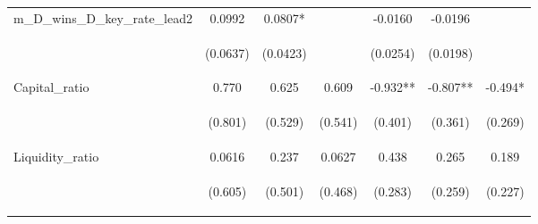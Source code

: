 \documentclass[]{article}
\begin{document}
\begin{center}
\begin{tabular}{lcccccc}
m\_D\_wins\_D\_key\_rate\_lead2 & 0.0992 & 0.0807* &  & -0.0160 & -0.0196 &  \\
\vspace{4pt} & \begin{footnotesize}(0.0637)\end{footnotesize} & \begin{footnotesize}(0.0423)\end{footnotesize} & \begin{footnotesize}\end{footnotesize} & \begin{footnotesize}(0.0254)\end{footnotesize} & \begin{footnotesize}(0.0198)\end{footnotesize} & \begin{footnotesize}\end{footnotesize} \\
Capital\_ratio & 0.770 & 0.625 & 0.609 & -0.932** & -0.807** & -0.494* \\
\vspace{4pt} & \begin{footnotesize}(0.801)\end{footnotesize} & \begin{footnotesize}(0.529)\end{footnotesize} & \begin{footnotesize}(0.541)\end{footnotesize} & \begin{footnotesize}(0.401)\end{footnotesize} & \begin{footnotesize}(0.361)\end{footnotesize} & \begin{footnotesize}(0.269)\end{footnotesize} \\
Liquidity\_ratio & 0.0616 & 0.237 & 0.0627 & 0.438 & 0.265 & 0.189 \\
\vspace{4pt} & \begin{footnotesize}(0.605)\end{footnotesize} & \begin{footnotesize}(0.501)\end{footnotesize} & \begin{footnotesize}(0.468)\end{footnotesize} & \begin{footnotesize}(0.283)\end{footnotesize} & \begin{footnotesize}(0.259)\end{footnotesize} & \begin{footnotesize}(0.227)\end{footnotesize} \\

\end{tabular}
\end{center}
\end{document}

